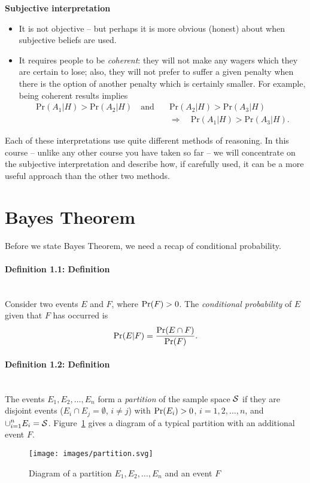 \textbf{Subjective interpretation}
\begin{itemize}
\item It is not objective -- but perhaps it is more obvious (honest) about when
subjective beliefs are used.
\item It requires people to be {\it coherent}: they will not make any
wagers which they are certain to lose; also, they will not prefer to
suffer a given penalty when there is the option of another penalty
which is certainly smaller. For example, being coherent results implies
\begin{align*}
\text{Pr}(A_1|H)>\text{Pr}(A_2|H)\quad\text{and}\quad &\text{Pr}(A_2|H)>\text{Pr}(A_3|H) \\
&\Longrightarrow\quad \text{Pr}(A_1|H)>\text{Pr}(A_3|H).
\end{align*}
\end{itemize}

Each of these interpretations use quite different methods of
reasoning. In this course -- unlike any other course you have taken so far -- we will concentrate on the subjective interpretation and
describe how, if carefully used, it can be a more useful approach than
the other two methods.

\section{Bayes Theorem}
Before we state Bayes Theorem, we need a recap of conditional
probability.

\paragraph{Definition 1.1: Definition}{~\\
Consider two events $E$ and $F$, where $\textnormal{Pr}(F)>0$. The
\textit{conditional probability} of $E$ given that $F$ has occurred is
$$
\textnormal{Pr}(E|F)=\frac{\textnormal{Pr}(E\cap F)}{\textnormal{Pr}(F)}.
$$}

\paragraph{Definition 1.2: Definition}{~\\
The events $E_1,E_2,\ldots,E_n$ form a {\it partition} of the sample
space ${\cal S}$ if they are disjoint events ($E_i\cap E_j=\emptyset$,
$i\neq j$) with $\textnormal{Pr}(E_i)>0$, $i=1,2,\ldots,n$, and
$\displaystyle{\cup_{i=1}^n E_i}={\cal S}$.
Figure~\ref{fig:partition} gives a diagram of a typical partition with
an additional event $F$.

\begin{figure}[ht]

\texttt{[image: images/partition.svg]}
\caption{Diagram of a partition $E_1,E_2,\ldots,E_n$ and an event $F$}
\label{fig:partition}

\end{figure}}
\clearpage
